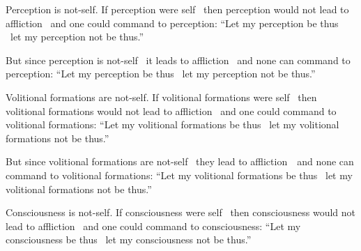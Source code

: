 \begin{english-only-hang}
Perception is not-self. If perception were self \breathmark\ then perception would not lead to affliction \breathmark\ and one could command to perception: ``Let my perception be thus \breathmark\ let my perception not be thus.''
\end{english-only-hang}

\begin{english-only-hang}
But since perception is not-self \breathmark\ it leads to affliction \breathmark\ and none can command to perception: ``Let my perception be thus \breathmark\ let my perception not be thus.''
\end{english-only-hang}

\begin{english-only-hang}
Volitional formations are not-self. If volitional formations were self \breathmark\ then volitional formations would not lead to affliction \breathmark\ and one could command to volitional formations: ``Let my volitional formations be thus \breathmark\ let my volitional formations not be thus.''
\end{english-only-hang}

\begin{english-only-hang}
But since volitional formations are not-self \breathmark\ they lead to \mbox{affliction}~\breathmark\ and none can command to volitional formations: ``Let my volitional formations be thus \breathmark\ let my volitional formations not be thus.''
\end{english-only-hang}

\begin{english-only-hang}
Consciousness is not-self. If consciousness were self \breathmark\ then consciousness would not lead to affliction \breathmark\ and one could command to consciousness: ``Let my consciousness be thus \breathmark\ let my consciousness not be thus.''
\end{english-only-hang}

